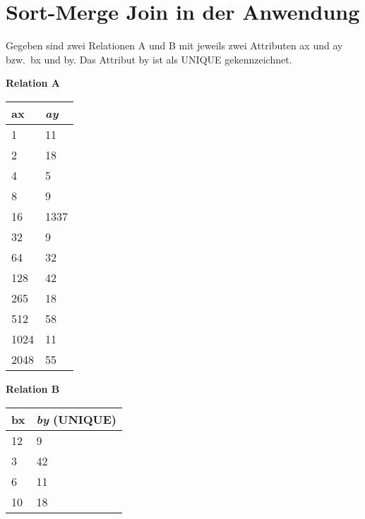 \section{Sort-Merge Join in der Anwendung}

Gegeben sind zwei Relationen A und B mit jeweils zwei Attributen ax und ay bzw.\ bx und by.
Das Attribut by ist als UNIQUE gekennzeichnet.

\begin{center}
	\begin{minipage}{5cm}
		\begin{center}

			\textbf{Relation A}
			\begin{tabular}{|p{2cm}|p{2cm}|}
				\hline
				\textbf{ax} & \textbf{\textit{ay}} \\\hline
				1 & 11 \\\hline
				2 & 18 \\\hline
				4 & 5 \\\hline
				8 & 9 \\\hline
				16 & 1337 \\\hline
				32 & 9 \\\hline
				64 & 32 \\\hline
				128 & 42 \\\hline
				265 & 18 \\\hline
				512 & 58 \\\hline
				1024 & 11 \\\hline
				2048 & 55 \\\hline
			\end{tabular}

		\end{center}
	\end{minipage}
	\hspace{2cm}
	\begin{minipage}{5cm}
		\begin{center}

			\textbf{Relation B}
			\begin{tabular}{|p{2cm}|p{3cm}|}
				\hline
				\textbf{bx} & \textbf{\textit{by} (UNIQUE)} \\\hline
				12 & 9 \\\hline
				3 & 42 \\\hline
				6 & 11 \\\hline
				10 & 18 \\\hline
			\end{tabular}

		\end{center}
	\end{minipage}
\end{center}

